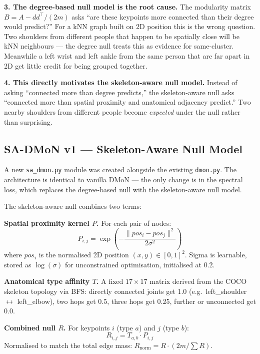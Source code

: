 \textbf{3. The degree-based null model is the root cause.} The modularity matrix $B = A - dd^\top / (2m)$ asks ``are these keypoints more connected than their degree would predict?'' For a kNN graph built on 2D position this is the wrong question. Two shoulders from different people that happen to be spatially close will be kNN neighbours --- the degree null treats this as evidence for same-cluster. Meanwhile a left wrist and left ankle from the same person that are far apart in 2D get little credit for being grouped together.

\textbf{4. This directly motivates the skeleton-aware null model.} Instead of asking ``connected more than degree predicts,'' the skeleton-aware null asks ``connected more than spatial proximity and anatomical adjacency predict.'' Two nearby shoulders from different people become \emph{expected} under the null rather than surprising.


\subsection{SA-DMoN v1 --- Skeleton-Aware Null Model}

A new \texttt{sa\_dmon.py} module was created alongside the existing \texttt{dmon.py}. The architecture is identical to vanilla DMoN --- the only change is in the spectral loss, which replaces the degree-based null with the skeleton-aware null model.

The skeleton-aware null combines two terms:

\textbf{Spatial proximity kernel $P$.} For each pair of nodes:
\begin{equation}
P_{i,j} = \exp\left(-\frac{\|pos_i - pos_j\|^2}{2\sigma^2}\right)
\end{equation}
where $pos_i$ is the normalised 2D position $(x, y) \in [0, 1]^2$. Sigma is learnable, stored as $\log(\sigma)$ for unconstrained optimisation, initialised at 0.2.

\textbf{Anatomical type affinity $T$.} A fixed $17 \times 17$ matrix derived from the COCO skeleton topology via BFS: directly connected joints get 1.0 (e.g.\ left\_shoulder $\leftrightarrow$ left\_elbow), two hops get 0.5, three hops get 0.25, further or unconnected get 0.0.

\textbf{Combined null $R$.} For keypoints $i$ (type $a$) and $j$ (type $b$):
\begin{equation}
R_{i,j} = T_{a,b} \cdot P_{i,j}
\end{equation}
Normalised to match the total edge mass: $R_{\text{norm}} = R \cdot (2m / \sum R)$.

